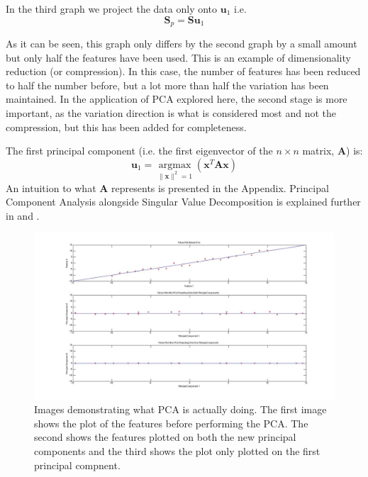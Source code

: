 \documentclass[11pt,a4paper]{article}
\begin{document}
In the third graph we project the data only onto $\mathbf{u}_1$ i.e.
\begin{equation*}
\mathbf{S}_p = \mathbf{S}\mathbf{u}_1
\end{equation*}

As it can be seen, this graph only differs by the second graph by a small amount but only half the features have been used. This is an example of dimensionality reduction (or compression). In this case, the number of features has been reduced to half the number before, but a lot more than half the variation has been maintained. In the application of PCA explored here, the second stage is more important, as the variation direction is what is considered most and not the compression, but this has been added for completeness.

The first principal component (i.e. the first eigenvector of the $n\times n$ matrix, $\mathbf{A}$) is:
\begin{equation}
\mathbf{u}_1 = \underset{\|\mathbf{x}\|^2 = 1}{\operatorname{argmax}}\left( \mathbf{x}^T\mathbf{A}\mathbf{x}\right)
\end{equation}
An intuition to what $\mathbf{A}$ represents is presented in the Appendix. Principal Component Analysis alongside Singular Value Decomposition is explained further in \cite{datascience} and \cite{bishop}. 

\begin{figure}[H]
\centering
\includegraphics[scale=0.35]{PCA_EXPLAINED.jpg}
\caption{Images demonstrating what PCA is actually doing. The first image shows the plot of the features before performing the PCA. The second shows the features plotted on both the new principal components and the third shows the plot only plotted on the first principal compnent.}
\label{pca}
\end{figure}
\end{document}
